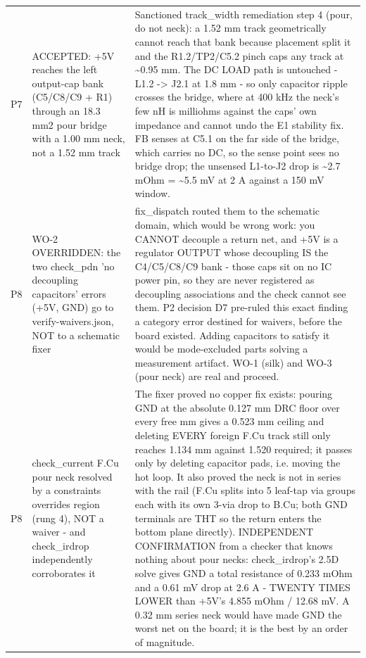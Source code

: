 \documentclass[11pt,a4paper]{article}
\begin{document}
{\begin{longtable}{lp{5.2cm}p{7.2cm}}
P7 & ACCEPTED: +5V reaches the left output-cap bank (C5/C8/C9 + R1) through an 18.3 mm2 pour bridge with a 1.00 mm neck, not a 1.52 mm track & Sanctioned track\_width remediation step 4 (pour, do not neck): a 1.52 mm track geometrically cannot reach that bank because placement split it and the R1.2/TP2/C5.2 pinch caps any track at \textasciitilde{}0.95 mm. The DC LOAD path is untouched - L1.2 -\textgreater{} J2.1 at 1.8 mm - so only capacitor ripple crosses the bridge, where at 400 kHz the neck's few nH is milliohms against the caps' own impedance and cannot undo the E1 stability fix. FB senses at C5.1 on the far side of the bridge, which carries no DC, so the sense point sees no bridge drop; the unsensed L1-to-J2 drop is \textasciitilde{}2.7 mOhm = \textasciitilde{}5.5 mV at 2 A against a 150 mV window. \\
P8 & WO-2 OVERRIDDEN: the two check\_pdn 'no decoupling capacitors' errors (+5V, GND) go to verify-waivers.json, NOT to a schematic fixer & fix\_dispatch routed them to the schematic domain, which would be wrong work: you CANNOT decouple a return net, and +5V is a regulator OUTPUT whose decoupling IS the C4/C5/C8/C9 bank - those caps sit on no IC power pin, so they are never registered as decoupling associations and the check cannot see them. P2 decision D7 pre-ruled this exact finding a category error destined for waivers, before the board existed. Adding capacitors to satisfy it would be mode-excluded parts solving a measurement artifact. WO-1 (silk) and WO-3 (pour neck) are real and proceed. \\
P8 & check\_current F.Cu pour neck resolved by a constraints overrides region (rung 4), NOT a waiver - and check\_irdrop independently corroborates it & The fixer proved no copper fix exists: pouring GND at the absolute 0.127 mm DRC floor over every free mm gives a 0.523 mm ceiling and deleting EVERY foreign F.Cu track still only reaches 1.134 mm against 1.520 required; it passes only by deleting capacitor pads, i.e. moving the hot loop. It also proved the neck is not in series with the rail (F.Cu splits into 5 leaf-tap via groups each with its own 3-via drop to B.Cu; both GND terminals are THT so the return enters the bottom plane directly). INDEPENDENT CONFIRMATION from a checker that knows nothing about pour necks: check\_irdrop's 2.5D solve gives GND a total resistance of 0.233 mOhm and a 0.61 mV drop at 2.6 A - TWENTY TIMES LOWER than +5V's 4.855 mOhm / 12.68 mV. A 0.32 mm series neck would have made GND the worst net on the board; it is the best by an order of magnitude. \\

\end{longtable}}
\end{document}
